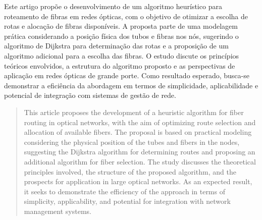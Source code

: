 \begin{resumo} 
  Este artigo propõe o desenvolvimento de um algoritmo heurístico para roteamento
  de fibras em redes ópticas, com o objetivo de otimizar a escolha de rotas e
  alocação de fibras disponíveis. A proposta parte de uma modelagem prática
  considerando a posição física dos tubos e fibras nos nós, sugerindo o algoritmo
  de Dijkstra para determinação das rotas e a proposição de um algoritmo
  adicional para a escolha das fibras. O estudo discute os princípios teóricos
  envolvidos, a estrutura do algoritmo proposto e as perspectivas de aplicação em
  redes ópticas de grande porte. Como resultado esperado, busca-se demonstrar a
  eficiência da abordagem em termos de simplicidade, aplicabilidade e potencial
  de integração com sistemas de gestão de rede.
\end{resumo}

\begin{abstract}
  This article proposes the development of a heuristic algorithm for fiber routing
  in optical networks, with the aim of optimizing route selection and
  allocation of available fibers. The proposal is based on practical modeling
  considering the physical position of the tubes and fibers in the nodes, suggesting the
  Dijkstra algorithm for determining routes and proposing an additional algorithm
  for fiber selection. The study discusses the theoretical principles
  involved, the structure of the proposed algorithm, and the prospects for application in
  large optical networks. As an expected result, it seeks to demonstrate the
  efficiency of the approach in terms of simplicity, applicability, and potential
  for integration with network management systems.
\end{abstract}

